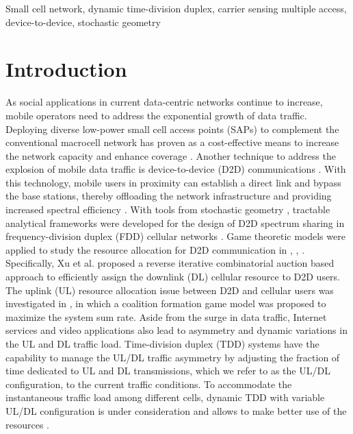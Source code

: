 \documentclass[twocolumn,english]{IEEEtran}
\theoremstyle{plain}
\theoremstyle{definition}
\begin{document}
\begin{IEEEkeywords}
Small cell network, dynamic time-division duplex, carrier sensing
multiple access, device-to-device, stochastic geometry
\end{IEEEkeywords}


\section{Introduction}

As social applications in current data-centric networks continue to
increase, mobile operators need to address the exponential growth
of data traffic. Deploying diverse low-power small cell\emph{ }access
points (SAPs) to complement the conventional macrocell network has
proven as a cost-effective means to increase the network capacity
and enhance coverage \cite{SCND,TTHW,OTCOD,CSCN}. Another technique
to address the explosion of mobile data traffic is device-to-device
(D2D) communications \cite{DDCI,GRAM_Song}. With this technology,
mobile users in proximity can establish a direct link and bypass the
base stations, thereby offloading the network infrastructure and providing
increased spectral efficiency \cite{SSFD,AMMS,ROID2D,ERAF_Song,CGFRA,OTCR}.
With tools from stochastic geometry \cite{SGAI}, tractable analytical
frameworks were developed for the design of D2D spectrum sharing in
frequency-division duplex (FDD) cellular networks \cite{SSFD,AMMS,ROID2D,OTCR}.
Game theoretic models were applied to study the resource allocation
for D2D communication in \cite{GRAM_Song}, \cite{ERAF_Song}, \cite{CGFRA}.
Specifically, Xu et al. \cite{ERAF_Song} proposed a reverse iterative
combinatorial auction based approach to efficiently assign the downlink
(DL) cellular resource to D2D users. The uplink (UL) resource allocation
issue between D2D and cellular users was investigated in \cite{CGFRA},
in which a coalition formation game model was proposed to maximize
the system sum rate. Aside from the surge in data traffic, Internet
services and video applications also lead to asymmetry and dynamic
variations in the UL and DL traffic load. Time-division duplex (TDD)
systems \cite{LTUL} have the capability to manage the UL/DL traffic
asymmetry by adjusting the fraction of time dedicated to UL and DL
transmissions, which we refer to as the UL/DL configuration, to the
current traffic conditions. To accommodate the instantaneous traffic
load among different cells, dynamic TDD with variable UL/DL configuration
is under consideration and allows to make better use of the resources
\cite{DUDC,DUDO}.
\end{document}

